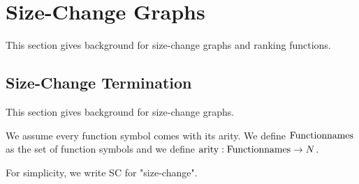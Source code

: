\section{Size-Change Graphs}

This section gives background for size-change graphs and
ranking functions.

\subsection{Size-Change Termination}

This section gives background for size-change graphs.

\begin{Def}\rm
We assume every function symbol comes with its arity.
We define ${\rm Functionnames}$ as the set of function symbols and
we define ${\rm arity} : {\rm Functionnames} \to N$.
\end{Def}

For simplicity, we write SC for "size-change".


